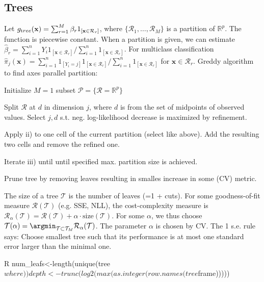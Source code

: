 \subsection{Trees}%
\label{sub:trees}
\begin{sectionbox}\nospacing{}
  Let $g_{\textrm tree}(\mathbf{x}) = \sum_{r=1}^{M}\beta_r 1_{[\mathbf{x}\in \mathcal{R}_r]}$, where $\{\mathcal{R}_1,\dots, \mathcal{R}_M\}$ is a partition of $\mathbb{R}^p$.
  The function is piecewise constant.
  When a partition is given,  we can estimate $\hat{\beta}_r = \sum_{i=1}^{n}Y_i 1_{[\mathbf{x}\in \mathcal{R}_r]}/\sum_{i=1}^{n}1_{[\mathbf{x}\in \mathcal{R}_r]}$.
  For multiclass classification $\hat{\pi}_j(\mathbf{x}) = \sum_{i=1}^{n}1_{[Y_i =j]} 1_{[\mathbf{x}\in \mathcal{R}_r]}/\sum_{i=1}^{n}1_{[\mathbf{x}\in \mathcal{R}_r]}$ for $\mathbf{x} \in \mathcal{R}_r$.
  Greddy algorithm to find axes parallel partition:
  \begin{enumeratenosep}[label=\roman*]
    \item Initialize $M=1$ subset $\mathcal{P} = \{\mathcal{R} = \mathbb{R}^p\}$
    \item Split $\mathcal{R}$ at $d$ in dimension $j$, where $d$ is from the set of midpoints of observed values.
      Select $j,d$ s.t. neg. log-likelihood decrease is maximized by refinement.
    \item Apply ii) to one cell of the current partition (select like above).
      Add the resulting two cells and remove the refined one. 
    \item Iterate iii) until until specified max. partition size is achieved.
    \item Prune tree by removing leaves resulting in smalles increase in some (CV) metric.
  \end{enumeratenosep}
  The size of a tree $\mathcal{T}$ is the number of leaves (=1 + cuts).
  For some goodness-of-fit measure $\mathcal{R}(\mathcal{T})$ (e.g. SSE, NLL), the cost-complexity measure is $\mathcal{R}_{\alpha}(\mathcal{T})=\mathcal{R}(\mathcal{T}) + \alpha \cdot\text{size}(\mathcal{T}) $.
  For some $\alpha$, we thus choose $\mathcal{T}(\alpha) = \argmin_{\mathcal{T}\subset\mathcal{T}_M}\mathcal{R}_{\alpha}(\mathcal{T})$.
  The parameter $\alpha$ is chosen by CV. The 1 s.e. rule says: Choose smallest tree such that its performance is at most one standard error larger than the minimal one. 
\end{sectionbox}

\begin{mintlinebox}{R}
num_leafs<-length(unique(tree$where))
depth <- trunc(log2(max(as.integer(row.names(tree$frame)))))
\end{mintlinebox}

